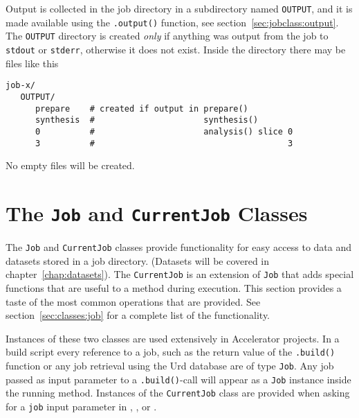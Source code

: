 Output is collected in the job directory in a subdirectory named
\texttt{OUTPUT}, and it is made available using the \texttt{.output()}
function, see section~\ref{sec:jobclass:output}.  The \texttt{OUTPUT}
directory is created \textsl{only} if anything was output from the job
to \texttt{stdout} or \texttt{stderr}, otherwise it does not exist.
Inside the directory there may be files like this
\begin{verbatim}
job-x/
   OUTPUT/
      prepare    # created if output in prepare()
      synthesis  #                      synthesis()
      0          #                      analysis() slice 0
      3          #                                       3
\end{verbatim}
No empty files will be created.




\section{The \texttt{Job} and \texttt{CurrentJob} Classes}
The \texttt{Job} and \texttt{CurrentJob} classes provide functionality
for easy access to data and datasets stored in a job directory.
(Datasets will be covered in chapter~\ref{chap:datasets}).
The \texttt{CurrentJob} is an extension of \texttt{Job} that adds
special functions that are useful to a method during execution.  This
section provides a taste of the most common operations that are
provided.  See section~\ref{sec:classes:job} for a complete list of
the functionality.

Instances of these two classes are used extensively in Accelerator
projects.  In a build script every reference to a job, such as the
return value of the
\texttt{.build()} function or any job retrieval using the Urd database
are of type \texttt{Job}.  Any job passed as input parameter to a
\texttt{.build()}-call will appear as a \texttt{Job} instance inside
the running method.  Instances of the \texttt{CurrentJob} class are
provided when asking for a \texttt{job} input parameter in
\prepare, \analysis, or \synthesis.


